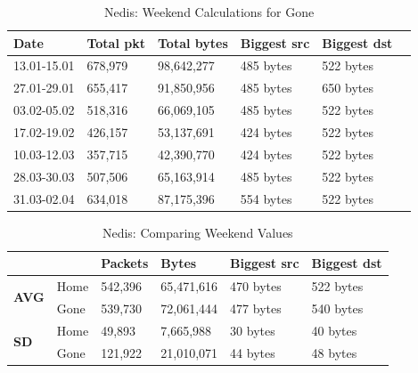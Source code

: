 \begin{table}[H]
    \caption{Nedis: Weekend Calculations for Gone}
    \begin{tabular}{|l|l|l|l|l|l|}
        \hline
        \textbf{Date} & \textbf{Total pkt} & \textbf{Total bytes} & \textbf{Biggest src} & \textbf{Biggest dst} \\ \hline
        13.01-15.01   & 678,979            & 98,642,277           & 485 bytes            & 522 bytes            \\ \hline
        27.01-29.01   & 655,417            & 91,850,956           & 485 bytes            & 650 bytes            \\ \hline
        03.02-05.02   & 518,316            & 66,069,105           & 485 bytes            & 522 bytes            \\ \hline
        17.02-19.02   & 426,157            & 53,137,691           & 424 bytes            & 522 bytes            \\ \hline
        10.03-12.03   & 357,715            & 42,390,770           & 424 bytes            & 522 bytes            \\ \hline
        28.03-30.03   & 507,506            & 65,163,914           & 485 bytes            & 522 bytes            \\ \hline
        31.03-02.04   & 634,018            & 87,175,396           & 554 bytes            & 522 bytes            \\ \hline
    \end{tabular}
    \label{tab:NedisGoneWeekends}
\end{table}

\begin{table}[H]
    \centering
    \caption{Nedis: Comparing Weekend Values}
    \begin{tabular}{ll|l|l|l|l|}
        \cline{3-6}
        \textbf{}                                           & \textbf{} & \textbf{Packets} & \textbf{Bytes} & \textbf{Biggest src} & \textbf{Biggest dst} \\ \hline
        \multicolumn{1}{|l|}{\multirow{2}{*}{\textbf{AVG}}} & Home      & 542,396          & 65,471,616     & 470 bytes            & 522 bytes            \\ \cline{2-6} 
        \multicolumn{1}{|l|}{}                              & Gone      & 539,730          & 72,061,444     & 477 bytes            & 540 bytes            \\ \hline
        \multicolumn{1}{|l|}{\multirow{2}{*}{\textbf{SD}}}  & Home      & 49,893           & 7,665,988      & 30 bytes             & 40 bytes             \\ \cline{2-6} 
        \multicolumn{1}{|l|}{}                              & Gone      & 121,922          & 21,010,071     & 44 bytes             & 48 bytes             \\ \hline
    \end{tabular}
    \label{tab:NedisWeekends}
\end{table}

